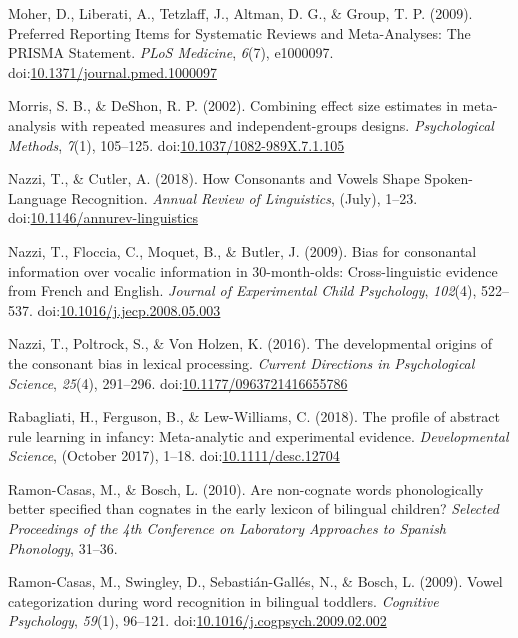 \documentclass[man]{apa6}
\begin{document}
\leavevmode\hypertarget{ref-Moher2009}{}%
Moher, D., Liberati, A., Tetzlaff, J., Altman, D. G., \& Group, T. P. (2009). Preferred Reporting Items for Systematic Reviews and Meta-Analyses: The PRISMA Statement. \emph{PLoS Medicine}, \emph{6}(7), e1000097. doi:\href{https://doi.org/10.1371/journal.pmed.1000097}{10.1371/journal.pmed.1000097}

\leavevmode\hypertarget{ref-morris2002combining}{}%
Morris, S. B., \& DeShon, R. P. (2002). Combining effect size estimates in meta-analysis with repeated measures and independent-groups designs. \emph{Psychological Methods}, \emph{7}(1), 105--125. doi:\href{https://doi.org/10.1037/1082-989X.7.1.105}{10.1037/1082-989X.7.1.105}

\leavevmode\hypertarget{ref-Nazzi2018}{}%
Nazzi, T., \& Cutler, A. (2018). How Consonants and Vowels Shape Spoken-Language Recognition. \emph{Annual Review of Linguistics}, (July), 1--23. doi:\href{https://doi.org/10.1146/annurev-linguistics}{10.1146/annurev-linguistics}

\leavevmode\hypertarget{ref-Nazzi2009a}{}%
Nazzi, T., Floccia, C., Moquet, B., \& Butler, J. (2009). Bias for consonantal information over vocalic information in 30-month-olds: Cross-linguistic evidence from French and English. \emph{Journal of Experimental Child Psychology}, \emph{102}(4), 522--537. doi:\href{https://doi.org/10.1016/j.jecp.2008.05.003}{10.1016/j.jecp.2008.05.003}

\leavevmode\hypertarget{ref-Nazzi2016}{}%
Nazzi, T., Poltrock, S., \& Von Holzen, K. (2016). The developmental origins of the consonant bias in lexical processing. \emph{Current Directions in Psychological Science}, \emph{25}(4), 291--296. doi:\href{https://doi.org/10.1177/0963721416655786}{10.1177/0963721416655786}

\leavevmode\hypertarget{ref-Rabagliati2018}{}%
Rabagliati, H., Ferguson, B., \& Lew-Williams, C. (2018). The profile of abstract rule learning in infancy: Meta-analytic and experimental evidence. \emph{Developmental Science}, (October 2017), 1--18. doi:\href{https://doi.org/10.1111/desc.12704}{10.1111/desc.12704}

\leavevmode\hypertarget{ref-Ramon-Casas2010}{}%
Ramon-Casas, M., \& Bosch, L. (2010). Are non-cognate words phonologically better specified than cognates in the early lexicon of bilingual children? \emph{Selected Proceedings of the 4th Conference on Laboratory Approaches to Spanish Phonology}, 31--36.

\leavevmode\hypertarget{ref-Ramon-Casas2009}{}%
Ramon-Casas, M., Swingley, D., Sebastián-Gallés, N., \& Bosch, L. (2009). Vowel categorization during word recognition in bilingual toddlers. \emph{Cognitive Psychology}, \emph{59}(1), 96--121. doi:\href{https://doi.org/10.1016/j.cogpsych.2009.02.002}{10.1016/j.cogpsych.2009.02.002}
\end{document}
